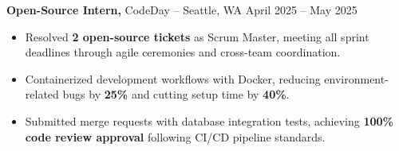 \documentclass[11pt]{article}
\begin{document}
\textbf{Open-Source Intern,} {CodeDay} -- Seattle, WA \hfill April 2025 -- May 2025
\vspace{-9pt}
\begin{itemize}
  \item Resolved \textbf{2 open-source tickets} as Scrum Master, meeting all sprint deadlines through agile ceremonies and cross-team coordination.
  \item Containerized development workflows with Docker, reducing environment-related bugs by \textbf{25\%} and cutting setup time by \textbf{40\%}.
  \item Submitted merge requests with database integration tests, achieving \textbf{100\% code review approval} following CI/CD pipeline standards.
\end{itemize}

\end{document}
